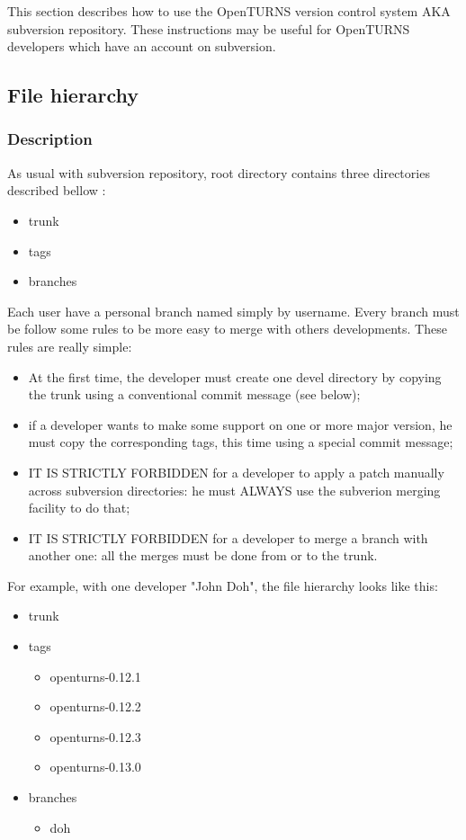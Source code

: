 \label{version_control}

This section describes how to use the OpenTURNS version control system AKA subversion repository. These instructions may be useful for OpenTURNS developers which have an account on subversion.



\subsection{File hierarchy}

\subsubsection{Description}

As usual with subversion repository, root directory contains three directories described bellow :
\begin{itemize}
\item trunk
\item tags
\item branches
\end{itemize}

Each user have a personal branch named simply by username. Every branch must be follow some rules to be more easy to merge with others developments. These rules are really simple:


\begin{itemize}
\item At the first time, the developer must create one devel directory by copying the trunk using a conventional commit message (see below);
\item if a developer wants to make some support on one or more major version, he must copy the corresponding tags, this time using a special commit message;
\item IT IS STRICTLY FORBIDDEN for a developer to apply a patch manually across subversion directories: he must ALWAYS use the subverion merging facility to do that;
\item IT IS STRICTLY FORBIDDEN for a developer to merge a branch with another one: all the merges must be done from or to the trunk.
\end{itemize}



For example, with one developer "John Doh", the file hierarchy looks like this:

\begin{itemize}
\item trunk
\item tags
\begin{itemize}
\item openturns-0.12.1
\item openturns-0.12.2
\item openturns-0.12.3
\item openturns-0.13.0
\end{itemize}
\item branches
\begin{itemize}
\item doh
\end{itemize}
\end{itemize}

